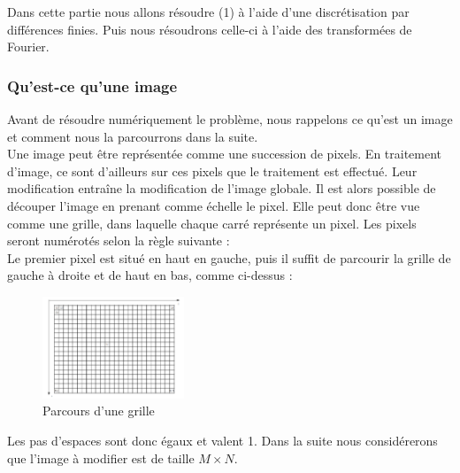 Dans cette partie nous allons résoudre (1) à l'aide d'une discrétisation par différences finies. Puis nous résoudrons celle-ci à l'aide des transformées de Fourier. \\
\subsubsection{Qu'est-ce qu'une image}
Avant de résoudre numériquement le problème, nous rappelons ce qu'est un image et comment nous la  parcourrons dans la suite.\\
Une image peut être représentée comme une succession de pixels. En traitement d'image, ce sont d'ailleurs sur ces pixels que le traitement est effectué. Leur modification entraîne la modification de l'image globale. Il est alors possible de découper l'image en prenant comme échelle le pixel. Elle peut donc être vue comme une grille, dans laquelle chaque carré représente un pixel. Les pixels seront numérotés selon la règle suivante : \\

Le premier pixel est situé en haut en gauche, puis il suffit de parcourir la grille de gauche à droite et de haut en bas, comme ci-dessus :  
\begin{figure}[!h]
     \centering
     \includegraphics[width = 120pt]{Images/grille.png}
	\caption{Parcours d'une grille}
\end{figure}

Les pas d'espaces sont donc égaux et valent 1. Dans la suite nous considérerons que l'image à modifier est de taille $M \times N$.

